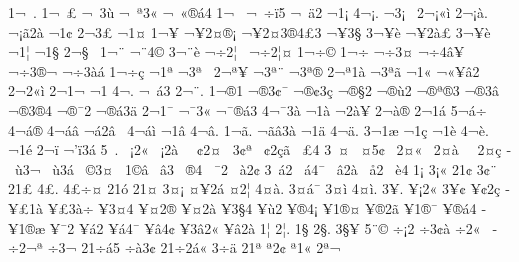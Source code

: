 {1^^ac^^a0.
1^^ac^^a0^^a3
^^ac^^a03^^f9
^^ac^^a0^^aa3^^ab
^^ac^^a0^^ab^^ae^^e14
1^^ac^^a0^^ad
^^ac^^a0^^ad^^f7^^ef5
^^ac^^a0^^e42
^^ac1^^a1
4^^ac^^a1.
^^ac3^^a1^^a0
2^^ac^^a1^^ab^^ec
2^^ac^^a1^^e0.
^^ac^^a1^^e32^^e0^^ad
^^ac1^^a2
2^^ac3^^a3
^^ac1^^a4
1^^ac^^a5
^^ac^^a52^^a4^^ae^^a1
^^ac^^a52^^a43^^ae4^^a33
^^ac^^a53^^a7
3^^ac^^a5^^ad^^e8
^^ac^^a52^^e0^^a3
3^^ac^^a5^^e8
^^ac1^^a6
^^ac1^^a7
2^^ac^^a7^^a0
1^^ac^^a8
^^ac^^a84^^a9^^ad
3^^ac^^a8^^e8
^^ac^^f72^^a6^^a0
^^ac^^f72^^a6^^a4
1^^ac^^f7^^a9
1^^ac^^f7^^ad
^^ac^^f73^^ad^^a4
^^ac^^f74^^ad^^e2^^a5
^^ac^^f73^^ae^^ac
^^ac^^f73^^e0^^e1
1^^ac^^f7^^e7
^^ac1^^aa
^^ac3^^aa^^a0
2^^ac^^aa^^a5
^^ac3^^aa^^a8
^^ac3^^aa^^ae
2^^ac^^aa1^^e0
^^ac3^^aa^^e3
^^ac1^^ab
^^ac^^ab^^a5^^e22
2^^ac2^^ab^^ec
2^^ac1^^ac
^^ac1^^ad
4^^ac^^ad.
^^ac^^ad^^a0^^e13
2^^ac^^ad^^a8.
1^^ac^^ae1
^^ac^^ae3^^a2^^af
^^ac^^ae^^a23^^e7
^^ac^^ae^^a72
^^ac^^ae^^f92
^^ac^^ae^^aa^^ae3
^^ac^^ae3^^ad^^e2
^^ac^^ae3^^ae4
^^ac^^ae^^af2
^^ac^^ae^^e13^^e4
2^^ac1^^af
^^ac^^af3^^ab
^^ac^^af^^ae^^e13
4^^ac^^af3^^e0
^^ac1^^e0
^^ac2^^e0^^a5
2^^ac^^e0^^ae
2^^ac1^^e1
5^^ac^^e1^^f7
4^^ac^^e1^^ae
4^^ac^^e1^^e2
^^ac^^e12^^e2^^a0
4^^ac^^e1^^ec
^^ac1^^e2
4^^ac^^e2.
1^^ac^^e3.
^^ac^^e3^^e23^^e0
^^ac1^^e4
4^^ac^^e4.
3^^ac1^^e6
^^ac1^^e7
^^ac1^^e8
4^^ac^^e8.
^^ac1^^e9
2^^ac^^ef
^^ac'^^ef3^^e1
5^^ad^^a0.
^^ad^^a0^^a12^^ab
^^ad^^a0^^a12^^e0^^a0
^^ad^^a0^^a22^^a4
^^ad^^a03^^a2^^aa
^^ad^^a0^^a22^^e7^^e3
^^ad^^a0^^a34
3^^ad^^a0^^a4
^^ad^^a0^^a45^^a2
^^ad^^a02^^a4^^ab
^^ad^^a02^^a4^^e0^^a0
^^ad^^a02^^a4^^e7
^^ad^^a0^^f93^^ac
^^ad^^a0^^f93^^e1
^^ad^^a0^^a93^^a4
^^ad^^a01^^a9^^e2
^^ad^^a0^^ad^^e23
^^ad^^a0^^ae4
^^ad^^a0^^af2
^^ad^^a0^^e02^^a2
3^^ad^^a0^^e12
^^ad^^a0^^e14^^af
^^ad^^a0^^e22^^e0
^^ad^^a0^^e52
^^ad^^a0^^e84
^^ad1^^a1
3^^ad^^a1^^ab
2^^ad1^^a2
3^^ad^^a2^^a8
2^^ad1^^a3
4^^ad^^a3.
4^^ad^^a3^^f7^^a4
2^^ad1^^f3
2^^ad1^^a4
^^ad3^^a4^^a1
^^ad^^a4^^a52^^e1
^^ad^^a42^^a6
4^^ad^^a4^^e0.
^^ad3^^a4^^e1^^af
^^ad3^^a4^^ec
4^^ad^^a4^^ec.
3^^ad^^a5.
^^ad^^a5^^a12^^ab
3^^ad^^a5^^a2
^^ad^^a5^^a22^^e7
^^ad^^a5^^a31^^e0
^^ad^^a5^^a33^^e0^^f7
^^ad^^a53^^a44
^^ad^^a5^^a42^^ae
^^ad^^a5^^a42^^e0
^^ad^^a53^^a74
^^ad^^a5^^f92
^^ad^^a5^^ae4^^a1
^^ad^^a51^^ae^^a4
^^ad^^a5^^ae2^^ad^^e3
^^ad^^a51^^ae^^af
^^ad^^a5^^ae^^e14
^^ad^^a51^^ae^^e6
^^ad^^a5^^af2
^^ad^^a5^^e12
^^ad^^a5^^e14^^af
^^ad^^a5^^e24^^a2
^^ad^^a53^^e22^^ab
^^ad^^a5^^e22^^e0
^^ad1^^a6
2^^ad^^a6.
^^ad1^^a7
2^^ad^^a7.
3^^ad^^a7^^a5
5^^ad^^a8^^a9
^^ad^^f7^^a12
^^ad^^f73^^a2^^e0
^^ad^^f72^^ab^^a0
^^ad^^f72^^ac^^aa
^^ad^^f73^^ac^^ad
2^^ad1^^f7^^ad^^e15
^^ad^^f7^^e03^^a2
2^^ad1^^f72^^e1^^ab
3^^ad^^f7^^e4
2^^ad1^^aa
^^ad^^aa2^^a2
^^ad^^aa1^^ab
^^ad2^^aa^^ac
}
